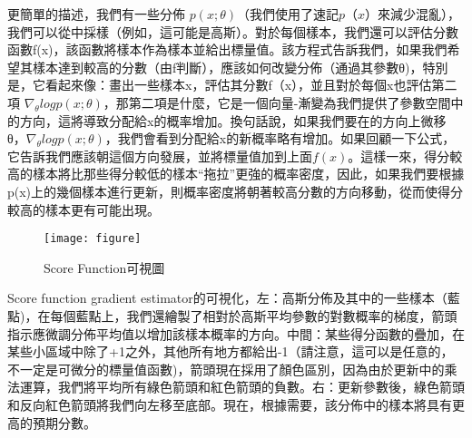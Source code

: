 更簡單的描述，我們有一些分佈 $p(x;\theta)$（我們使用了速記$ p（x）$來減少混亂），我們可以從中採樣（例如，這可能是高斯）。對於每個樣本，我們還可以評估分數函數f(x)，該函數將樣本作為樣本並給出標量值。該方程式告訴我們，如果我們希望其樣本達到較高的分數（由f判斷），應該如何改變分佈（通過其參數θ)，特別是，它看起來像：畫出一些樣本x，評估其分數f（x），並且對於每個x也評估第二項 $\nabla_\theta logp(x;θ)$，那第二項是什麼，它是一個向量-漸變為我們提供了參數空間中的方向，這將導致分配給x的概率增加。換句話說，如果我們要在的方向上微移θ，$\nabla_\theta logp(x;θ)$，我們會看到分配給x的新概率略有增加。如果回顧一下公式，它告訴我們應該朝這個方向發展，並將標量值加到上面$f(x)$。這樣一來，得分較高的樣本將比那些得分較低的樣本“拖拉”更強的概率密度，因此，如果我們要根據p(x)上的幾個樣本進行更新，則概率密度將朝著較高分數的方向移動，從而使得分較高的樣本更有可能出現。\\
\begin{figure}[hbt!]
\begin{center}
\texttt{[image: figure]}
\caption{Score Function可視圖}
\end{center}
\end{figure}

 Score function gradient estimator的可視化，左：高斯分佈及其中的一些樣本（藍點)，在每個藍點上，我們還繪製了相對於高斯平均參數的對數概率的梯度，箭頭指示應微調分佈平均值以增加該樣本概率的方向。中間：某些得分函數的疊加，在某些小區域中除了+1之外，其他所有地方都給出-1（請注意，這可以是任意的，不一定是可微分的標量值函數)，箭頭現在採用了顏色區別，因為由於更新中的乘法運算，我們將平均所有綠色箭頭和紅色箭頭的負數。右：更新參數後，綠色箭頭和反向紅色箭頭將我們向左移至底部。現在，根據需要，該分佈中的樣本將具有更高的預期分數。\\
\newpage